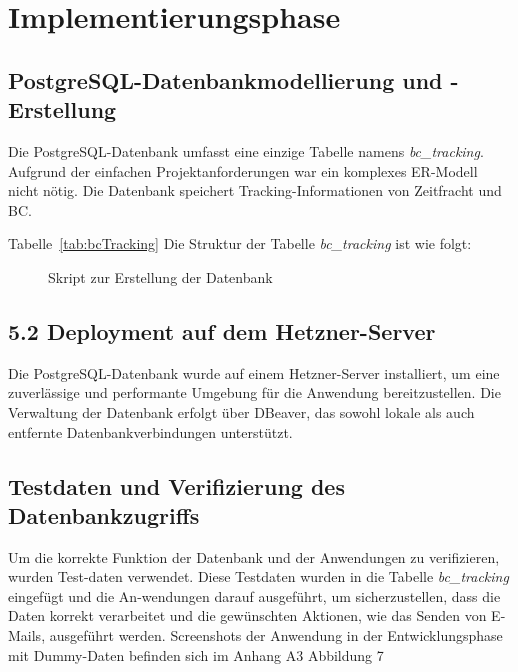 \section{Implementierungsphase} 
\label{sec:Implementierungsphase}

\subsection{PostgreSQL-Datenbankmodellierung und -Erstellung}
\label{sec:Datenbankmodellierung}

Die PostgreSQL-Datenbank umfasst eine einzige Tabelle namens \textit{bc\_tracking}. 
Aufgrund der einfachen Projektanforderungen war ein komplexes ER-Modell nicht nötig. 
Die Datenbank speichert Tracking-Informationen von Zeitfracht und BC.

Tabelle~\ref{tab:bcTracking} Die Struktur der Tabelle \textit{bc\_tracking} ist wie folgt:
\\

\begin{figure}[htb]
    \centering
    \caption{Skript zur Erstellung der Datenbank}
    \label{fig:DatenbankBCTracking}
\end{figure}

\clearpage

\subsection{5.2	Deployment auf dem Hetzner-Server}
\label{sec:Hetzner-Server}

Die PostgreSQL-Datenbank wurde auf einem Hetzner-Server installiert, um eine zuverlässige und performante 
Umgebung für die Anwendung bereitzustellen. Die Verwaltung der Datenbank erfolgt über DBeaver, das sowohl 
lokale als auch entfernte Datenbankverbindungen unterstützt.

\subsection{Testdaten und Verifizierung des Datenbankzugriffs}
\label{sec:VerifizierungTestdaten}

Um die korrekte Funktion der Datenbank und der Anwendungen zu verifizieren, wurden Test-daten verwendet. 
Diese Testdaten wurden in die Tabelle \textit{bc\_tracking} eingefügt und die An-wendungen darauf ausgeführt, 
um sicherzustellen, dass die Daten korrekt verarbeitet und die gewünschten Aktionen, wie das Senden von E-Mails, 
ausgeführt werden. Screenshots der Anwendung in der Entwicklungsphase mit Dummy-Daten befinden sich im Anhang A3 Abbildung 7

